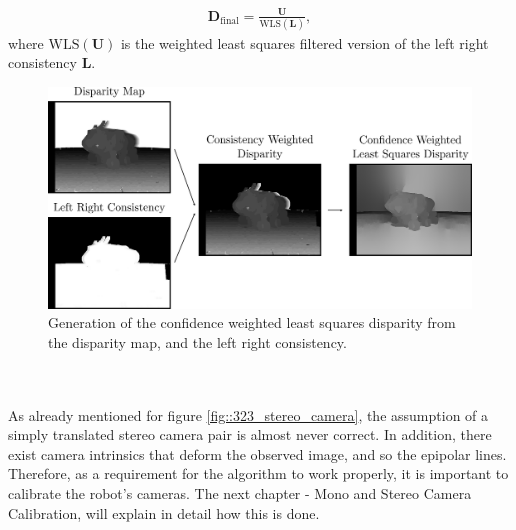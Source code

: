 \begin{align}
	\bm{D}_\text{final} = \frac{\bm{U}}{\text{WLS}(\bm{L})},
\end{align}
where $\text{WLS}(\bm{U})$ is the weighted least squares filtered version of the left right consistency $\bm{L}$.
\begin{figure}[h]
	\centering
	\includegraphics[scale=.28]{chapters/03_background/img/weighted_least_squares_disparity.png}
	\caption{Generation of the confidence weighted least squares disparity from the disparity map, and the left right consistency.}
	\label{fig::323_weighted_least_squares_disparity}
\end{figure}
\\\\
As already mentioned for figure \ref{fig::323_stereo_camera}, the assumption of a simply translated stereo camera pair is almost never correct. In addition, there exist camera intrinsics that deform the observed image, and so the epipolar lines. Therefore, as a requirement for the algorithm to work properly, it is important to calibrate the robot's cameras. The next chapter - Mono and Stereo Camera Calibration, will explain in detail how this is done.
